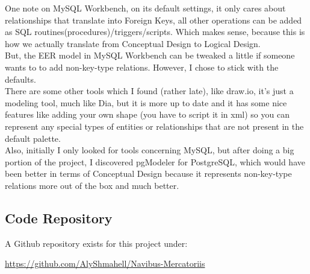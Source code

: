 \documentclass[12pt]{scrartcl}
\begin{document}
One note on MySQL Workbench, on its default settings, it only cares about relationships that translate into Foreign Keys, all other operations can be added as SQL routines(procedures)/triggers/scripts. Which makes sense, because this is how we actually translate from Conceptual Design to Logical Design.\\
But, the EER model in MySQL Workbench can be tweaked a little if someone wants to to add non-key-type relations. However, I chose to stick with the defaults.\\

There are some other tools which I found (rather late), like draw.io, it's just a modeling tool, much like Dia, but it is more up to date and it has some nice features like adding your own shape (you have to script it in xml) so you can represent any special types of entities or relationships that are not present in the default palette.\\
Also, initially I only looked for tools concerning MySQL, but after doing a big portion of the project, I discovered pgModeler for PostgreSQL, which would have been better in terms of Conceptual Design because it represents non-key-type relations more out of the box and much better.\\

\newpage

\newpage


\begin{flushleft}
	\section*{\textbf{Code Repository}}
\end{flushleft}
\begin{flushleft}
	A Github repository exists for this project under:\\
\end{flushleft}
	\begin{center}
		\url{https://github.com/AlyShmahell/Navibus-Mercatoriis}
	\end{center}
	
\end{document}
